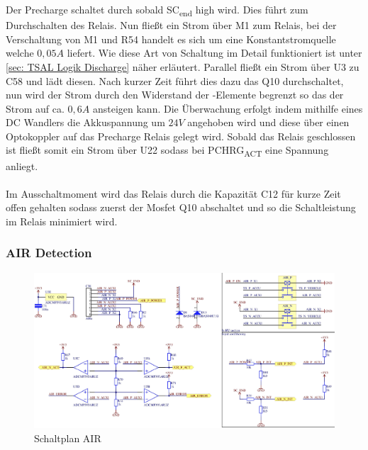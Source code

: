 Der Precharge schaltet durch sobald SC\textsubscript{end} high wird. Dies führt zum Durchschalten des Relais. Nun fließt ein Strom über M1 zum Relais, bei der Verschaltung von M1 und R54 handelt es sich um eine Konstantstromquelle welche \ensuremath{0,05A} liefert. Wie diese Art von Schaltung im Detail funktioniert ist unter \ref{sec: TSAL Logik Discharge} näher erläutert. Parallel fließt ein Strom über U3 zu C58 und lädt diesen. Nach kurzer Zeit führt dies dazu das Q10 durchschaltet, nun wird der Strom durch den Widerstand der -Elemente begrenzt so das der Strom auf ca. \ensuremath{0,6 A} ansteigen kann. Die Überwachung erfolgt indem mithilfe eines DC Wandlers die Akkuspannung um \ensuremath{24 V} angehoben wird und diese über einen Optokoppler auf das Precharge Relais gelegt wird. Sobald das Relais geschlossen ist fließt somit ein Strom über U22 sodass bei PCHRG\textsubscript{ACT} eine Spannung anliegt.\\
\\
Im Ausschaltmoment wird das Relais durch die Kapazität C12 für kurze Zeit offen gehalten sodass zuerst der Mosfet Q10 abschaltet und so die Schaltleistung im Relais minimiert wird.
\FloatBarrier

\subsubsection{\ac{AIR} Detection}

\begin{figure}
	\centering
	\includegraphics[width=0.8\linewidth]{bilder/AIR_conditioning}
	\caption{Schaltplan AIR}
	\label{fig:airconditioning}
\end{figure}

